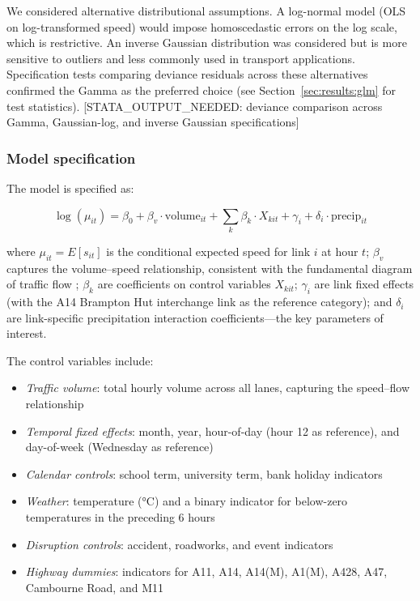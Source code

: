 \documentclass[review]{elsarticle}
\begin{document}
We considered alternative distributional assumptions. A log-normal model (OLS on log-transformed speed) would impose homoscedastic errors on the log scale, which is restrictive. An inverse Gaussian distribution was considered but is more sensitive to outliers and less commonly used in transport applications. Specification tests comparing deviance residuals across these alternatives confirmed the Gamma as the preferred choice (see Section~\ref{sec:results:glm} for test statistics). [STATA\_OUTPUT\_NEEDED: deviance comparison across Gamma, Gaussian-log, and inverse Gaussian specifications]

\subsubsection{Model specification}

The model is specified as:

\begin{equation}
\label{eq:glm}
\log(\mu_{it}) = \beta_0 + \beta_v \cdot \text{volume}_{it} + \sum_k \beta_k \cdot X_{kit} + \gamma_i + \delta_i \cdot \text{precip}_{it}
\end{equation}

\noindent where $\mu_{it} = E[s_{it}]$ is the conditional expected speed for link $i$ at hour $t$; $\beta_v$ captures the volume--speed relationship, consistent with the fundamental diagram of traffic flow \citep{greenshields1935study}; $\beta_k$ are coefficients on control variables $X_{kit}$; $\gamma_i$ are link fixed effects (with the A14 Brampton Hut interchange link as the reference category); and $\delta_i$ are link-specific precipitation interaction coefficients---the key parameters of interest.

The control variables include:

\begin{itemize}
    \item \textit{Traffic volume}: total hourly volume across all lanes, capturing the speed--flow relationship
    \item \textit{Temporal fixed effects}: month, year, hour-of-day (hour 12 as reference), and day-of-week (Wednesday as reference)
    \item \textit{Calendar controls}: school term, university term, bank holiday indicators
    \item \textit{Weather}: temperature (\si{\degreeCelsius}) and a binary indicator for below-zero temperatures in the preceding 6 hours
    \item \textit{Disruption controls}: accident, roadworks, and event indicators
    \item \textit{Highway dummies}: indicators for A11, A14, A14(M), A1(M), A428, A47, Cambourne Road, and M11
\end{itemize}
\end{document}
